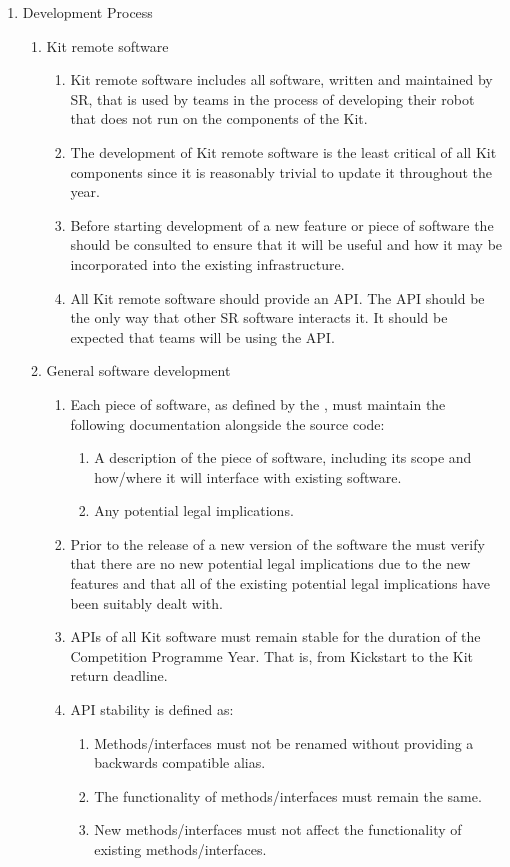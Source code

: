 \begin{draft}
\begin{enumerate}
\item Development Process
  \begin{enumerate}
    \item Kit remote software
      \begin{enumerate}
        \item Kit remote software includes all software, written and maintained by SR, that is used by teams in the process of developing their robot that does not run on the components of the Kit.
        \item The development of Kit remote software is the least critical of all Kit components since it is reasonably trivial to update it throughout the year.
        \item Before starting development of a new feature or piece of software the  should be consulted to ensure that it will be useful and how it may be incorporated into the existing infrastructure.
        \item All Kit remote software should provide an API. The API should be the only way that other SR software interacts it. It should be expected that teams will be using the API.
      \end{enumerate}
    \item General software development
      \begin{enumerate}
        \item Each piece of software, as defined by the , must maintain the following documentation alongside the source code:
          \begin{enumerate}
            \item A description of the piece of software, including its scope and how/where it will interface with existing software.
            \item Any potential legal implications.
          \end{enumerate}
        \item Prior to the release of a new version of the software the  must verify that there are no new potential legal implications due to the new features and that all of the existing potential legal implications have been suitably dealt with.
        \item APIs of all Kit software must remain stable for the duration of the Competition Programme Year. That is, from Kickstart to the Kit return deadline.
        \item API stability is defined as:
          \begin{enumerate}
            \item Methods/interfaces must not be renamed without providing a backwards compatible alias.
            \item The functionality of methods/interfaces must remain the same.
            \item New methods/interfaces must not affect the functionality of existing methods/interfaces.
          \end{enumerate}
      \end{enumerate}
  \end{enumerate}


\end{enumerate}
\end{draft}
